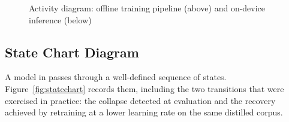 \begin{figure}[H]
{}
\caption{Activity diagram: offline training pipeline (above) and on-device inference (below)}
\label{fig:activity}
\end{figure}

\subsection{State Chart Diagram}
\label{subsec:statechart}

A model in \setu{} passes through a well-defined sequence of states.
Figure~\ref{fig:statechart} records them, including the two transitions that
were exercised in practice: the collapse detected at evaluation and the recovery
achieved by retraining at a lower learning rate on the same distilled corpus.


